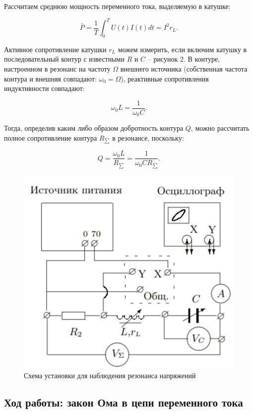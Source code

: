 \documentclass[a4paper, fontsize = 14pt]{article}
\begin{document}
Рассчитаем среднюю мощность переменного тока, выделяемую в катушке:

\begin{equation}
	\bar P = \frac{1}{T} \int_0^T U(t) I(t) dt = I^2 r_L. 
\end{equation}

Активное сопротивление катушки $r_L$ можем измерить, если включим катушку в последовательный контур с известными $R$ и $C$ -- рисунок 2. В контуре, настроенном в резонанс на частоту $\Omega$ внешнего источника (собственная частота контура и внешняя совпадают: $\omega_0 = \Omega$), реактивные сопротивления индуктивности совпадают:

\begin{equation}
	\omega_0 L = \frac{1}{\omega_0 C}. 
\end{equation}

Тогда, определив каким либо образом добротность контура $Q$, можно рассчитать полное сопротивление контура $R_{\sum}$ в резонансе, поскольку:

\begin{equation}
	Q = \frac{\omega_0 L}{R_{\sum}} = \frac{1}{\omega_0 C R_{
	\sum}}. 
\end{equation}

\begin{figure}[hbt]
	\centering
	\includegraphics[scale=0.8]{lab48ris2.png}
	\caption{Схема установки для наблюдения резонанса напряжений}
\end{figure}

\subsection*{Ход работы: закон Ома в цепи переменного тока}
\end{document}
